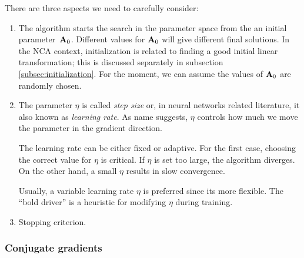 	There are three aspects we need to carefully consider:
	\begin{enumerate}
	 \item The algorithm starts the search in the parameter space from the an initial parameter~$\mathbf{A}_0$. Different values for $\mathbf{A}_0$ will give different final solutions. In the NCA context, initialization is related to finding a good initial linear transformation; this is discussed  separately in subsection \ref{subsec:initialization}. For the moment, we can assume the values of $\mathbf{A}_0$ are randomly chosen.
	 \item The parameter $\eta$ is called \textit{step size} or, in neural networks related literature, it also known as \textit{learning rate}. As name suggests, $\eta$ controls how much we move the parameter in the gradient direction. 

	The learning rate can be either fixed or adaptive. For the first case, choosing the correct value for $\eta$ is critical. If $\eta$ is set too large, the algorithm diverges. On the other hand, a small $\eta$ results in slow convergence. 

	Usually, a variable learning rate $\eta$ is preferred since its more flexible. The ``bold driver'' is a heuristic for modifying $\eta$ during training.

	 \item Stopping criterion. 
	\end{enumerate}



	\subsubsection*{Conjugate gradients}
	

